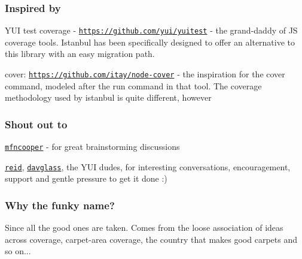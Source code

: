 \subsubsection*{Inspired by}


\begin{DoxyItemize}
\item Y\+U\+I test coverage -\/ \href{https://github.com/yui/yuitest}{\tt https\+://github.\+com/yui/yuitest} -\/ the grand-\/daddy of J\+S coverage tools. Istanbul has been specifically designed to offer an alternative to this library with an easy migration path.
\item cover\+: \href{https://github.com/itay/node-cover}{\tt https\+://github.\+com/itay/node-\/cover} -\/ the inspiration for the {\ttfamily cover} command, modeled after the {\ttfamily run} command in that tool. The coverage methodology used by istanbul is quite different, however
\end{DoxyItemize}

\subsubsection*{Shout out to}


\begin{DoxyItemize}
\item \href{https://github.com/mfncooper}{\tt mfncooper} -\/ for great brainstorming discussions
\item \href{https://github.com/reid}{\tt reid}, \href{https://github.com/davglass}{\tt davglass}, the Y\+U\+I dudes, for interesting conversations, encouragement, support and gentle pressure to get it done \+:)
\end{DoxyItemize}

\subsubsection*{Why the funky name?}

Since all the good ones are taken. Comes from the loose association of ideas across coverage, carpet-\/area coverage, the country that makes good carpets and so on... 